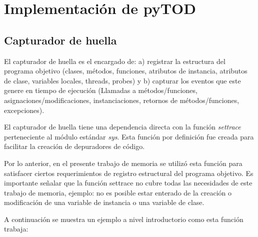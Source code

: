 \documentclass[12pt,legalpaper]{report}
\begin{document}
	\section{Implementación de pyTOD}
		\subsection{Capturador de huella}
		
El capturador de huella es el encargado de: a) registrar la estructura del programa objetivo (clases, métodos, funciones, atributos de instancia, atributos de clase, variables locales, threads, probes) y b) capturar los eventos que este genere en tiempo de ejecución (Llamadas a métodos/funciones, asignaciones/modificaciones, instanciaciones, retornos de métodos/funciones, excepciones). 

El capturador de huella tiene una dependencia directa con la función \textit{settrace} \cite{settrace} perteneciente al módulo estándar \textit{sys}.  Esta función por definición fue creada para facilitar la creación de depuradores de código.

Por lo anterior, en el presente trabajo de memoria se utilizó esta función para satisfacer ciertos requerimientos de registro estructural del programa objetivo.  Es importante señalar que la función settrace no cubre todas las necesidades de este trabajo de memoria, ejemplo: no es posible estar enterado de la creación o modificación de una variable de instancia o una variable de clase.

A continuación se muestra un ejemplo a nivel introductorio como esta función trabaja:
\end{document}
